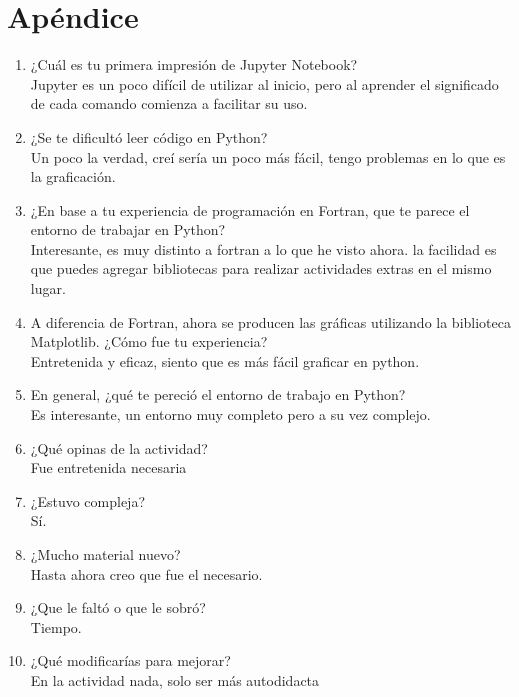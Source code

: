 \documentclass{article}
\begin{document}
\section{Apéndice}
\begin{enumerate}

\item {¿Cuál es tu primera impresión de Jupyter Notebook?}\\
Jupyter es un poco difícil de utilizar al inicio, pero al aprender el significado de cada comando comienza a facilitar su uso.

\item {¿Se te dificultó leer código en Python?}\\
Un poco la verdad, creí sería un poco más fácil, tengo problemas en lo que es la graficación.
\item{¿En base a tu experiencia de programación en Fortran, que te parece el entorno de trabajar en Python?}\\
Interesante, es muy distinto a fortran a lo que he visto ahora. la facilidad es que puedes agregar bibliotecas para realizar actividades extras en el mismo lugar.

\item{A diferencia de Fortran, ahora se producen las gráficas utilizando la biblioteca Matplotlib. ¿Cómo fue tu experiencia?}\\
Entretenida y eficaz, siento que es más fácil graficar en python.

\item {En general, ¿qué te pereció el entorno de trabajo en Python?}\\
Es interesante, un entorno muy completo pero a su vez complejo.

\item {¿Qué opinas de la actividad?}\\
Fue entretenida  necesaria
\item{¿Estuvo compleja?}\\
Sí.
\item{¿Mucho material nuevo?}\\
Hasta ahora creo que fue el necesario.
\item{¿Que le faltó o que le sobró?}\\
Tiempo.
\item{¿Qué modificarías para mejorar?}\\
En la actividad nada, solo ser más autodidacta
\end{enumerate}
\end{document}
